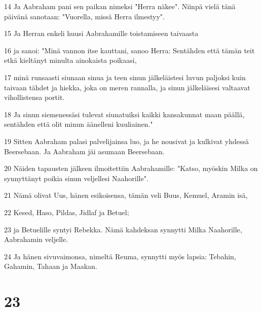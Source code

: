 \par 14 Ja Aabraham pani sen paikan nimeksi "Herra näkee". Niinpä vielä tänä päivänä sanotaan: "Vuorella, missä Herra ilmestyy".
\par 15 Ja Herran enkeli huusi Aabrahamille toistamiseen taivaasta
\par 16 ja sanoi: "Minä vannon itse kauttani, sanoo Herra: Sentähden että tämän teit etkä kieltänyt minulta ainokaista poikaasi,
\par 17 minä runsaasti siunaan sinua ja teen sinun jälkeläistesi luvun paljoksi kuin taivaan tähdet ja hiekka, joka on meren rannalla, ja sinun jälkeläisesi valtaavat vihollistensa portit.
\par 18 Ja sinun siemenessäsi tulevat siunatuiksi kaikki kansakunnat maan päällä, sentähden että olit minun äänelleni kuuliainen."
\par 19 Sitten Aabraham palasi palvelijainsa luo, ja he nousivat ja kulkivat yhdessä Beersebaan. Ja Aabraham jäi asumaan Beersebaan.
\par 20 Näiden tapausten jälkeen ilmoitettiin Aabrahamille: "Katso, myöskin Milka on synnyttänyt poikia sinun veljellesi Naahorille".
\par 21 Nämä olivat Uus, hänen esikoisensa, tämän veli Buus, Kemuel, Aramin isä,
\par 22 Kesed, Haso, Pildas, Jidlaf ja Betuel;
\par 23 ja Betuelille syntyi Rebekka. Nämä kahdeksan synnytti Milka Naahorille, Aabrahamin veljelle.
\par 24 Ja hänen sivuvaimonsa, nimeltä Reuma, synnytti myös lapsia: Tebahin, Gahamin, Tahaan ja Maakan.

\chapter{23}

